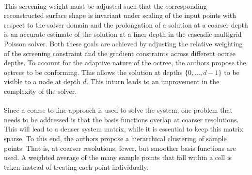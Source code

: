 \documentclass[12pt,a4paper]{article}
\begin{document}
\paragraph{}This screening weight must be adjusted such that the corresponding reconstructed surface shape is invariant under scaling of the input points with respect to the solver domain and the prolongation of a solution at a coarser depth is an accurate estimate of the solution at a finer depth in the cascadic multigrid Poisson solver. Both these goals are achieved by adjusting the relative weighting of the screening constraint and the gradient constraints across different octree depths. To account for the adaptive nature of the octree, the authors propose the octrees to be conforming. This allows the solution at depths $\{0,\dotsc,d-1\}$ to be visible to a node at depth $d$. This inturn leads to an improvement in the complexity of the solver.

\paragraph{}Since a coarse to fine approach is used to solve the system, one problem that needs to be addressed is that the basis functions overlap at coarser resolutions. This will lead to a denser system matrix, while it is essential to keep this matrix sparse. To this end, the authors propose a hierarchical clustering of sample points. That is, at coarser resolutions, fewer, but smoother basis functions are used. A weighted average of the many sample points that fall within a cell is taken instead of treating each point individually.
\end{document}
